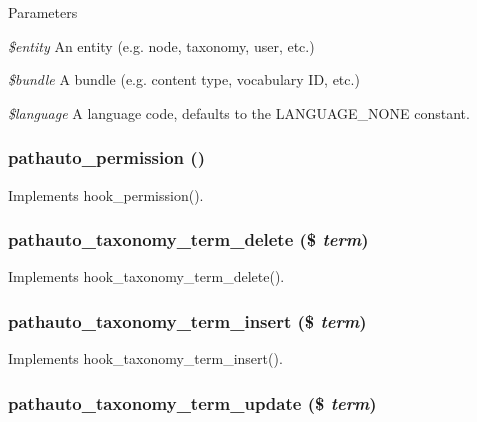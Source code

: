 \begin{DoxyParams}{Parameters}
\item[{\em \$entity}]An entity (e.g. node, taxonomy, user, etc.) \item[{\em \$bundle}]A bundle (e.g. content type, vocabulary ID, etc.) \item[{\em \$language}]A language code, defaults to the LANGUAGE\_\-NONE constant. \end{DoxyParams}
\hypertarget{pathauto_8module_ae4a5383114e3ed0695e109bbde6590ca}{
\subsubsection[{pathauto\_\-permission}]{\setlength{\rightskip}{0pt plus 5cm}pathauto\_\-permission ()}}
\label{pathauto_8module_ae4a5383114e3ed0695e109bbde6590ca}
Implements hook\_\-permission(). \hypertarget{pathauto_8module_a8ac059064afc0e0a3a6f6e8e3820a2fa}{
\subsubsection[{pathauto\_\-taxonomy\_\-term\_\-delete}]{\setlength{\rightskip}{0pt plus 5cm}pathauto\_\-taxonomy\_\-term\_\-delete (\$ {\em term})}}
\label{pathauto_8module_a8ac059064afc0e0a3a6f6e8e3820a2fa}
Implements hook\_\-taxonomy\_\-term\_\-delete(). \hypertarget{pathauto_8module_a835922153a91d17a66c4258256017e39}{
\subsubsection[{pathauto\_\-taxonomy\_\-term\_\-insert}]{\setlength{\rightskip}{0pt plus 5cm}pathauto\_\-taxonomy\_\-term\_\-insert (\$ {\em term})}}
\label{pathauto_8module_a835922153a91d17a66c4258256017e39}
Implements hook\_\-taxonomy\_\-term\_\-insert(). \hypertarget{pathauto_8module_ab861a0bd8ac0d1116d50dc5e446e510b}{
\subsubsection[{pathauto\_\-taxonomy\_\-term\_\-update}]{\setlength{\rightskip}{0pt plus 5cm}pathauto\_\-taxonomy\_\-term\_\-update (\$ {\em term})}}
